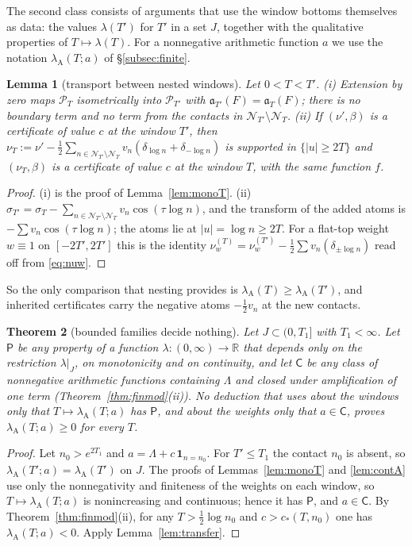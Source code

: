 \documentclass[11pt]{amsart}
\newtheorem{theorem}{Theorem}[section]
\newtheorem{lemma}[theorem]{Lemma}
\theoremstyle{definition}
\theoremstyle{remark}
\newcommand{\R}{\mathbb R}
\newcommand{\PT}{\mathcal P_T}
\newcommand{\lamA}{\lambda_{\mathrm A}(T)}
\newcommand{\sT}{\sigma_T}
\newcommand{\NT}{\mathcal N_T}
\begin{document}
The second class consists of arguments that use the window bottoms themselves as data: the values $\lambda(T')$ for
$T'$ in a set $J$, together with the qualitative properties of $T\mapsto\lambda(T)$. For a nonnegative arithmetic
function $a$ we use the notation $\lambda_{\mathrm A}(T;a)$ of \S\ref{subsec:finite}.

\begin{lemma}[transport between nested windows]\label{lem:transport}
Let $0<T<T'$. \emph{(i)} Extension by zero maps $\PT$ isometrically into $\mathcal P_{T'}$ with
$\mathfrak a_{T'}(F)=\mathfrak a_T(F)$; there is no boundary term and no term from the contacts in
$\mathcal N_{T'}\setminus\NT$. \emph{(ii)} If $(\nu',\beta)$ is a certificate of value $c$ at the window $T'$, then
$\nu_T:=\nu'-\frac12\sum_{n\in\mathcal N_{T'}\setminus\NT}v_n(\delta_{\log n}+\delta_{-\log n})$ is supported in
$\{|u|\ge2T\}$ and $(\nu_T,\beta)$ is a certificate of value $c$ at the window $T$, with the same function $f$.
\end{lemma}
\begin{proof}
(i) is the proof of Lemma~\ref{lem:monoT}. (ii) $\sigma_{T'}=\sT-\sum_{n\in\mathcal N_{T'}\setminus\NT}v_n\cos(\tau\log n)$,
and the transform of the added atoms is $-\sum v_n\cos(\tau\log n)$; the atoms lie at $|u|=\log n\ge2T$. For a
flat-top weight $w\equiv1$ on $[-2T',2T']$ this is the identity $\nu_w^{(T)}=\nu_w^{(T')}-\frac12\sum v_n(\delta_{\pm\log n})$
read off from \eqref{eq:nuw}.
\end{proof}

So the only comparison that nesting provides is $\lamA\ge\lambda_{\mathrm A}(T')$, and inherited certificates carry
the negative atoms $-\frac12v_n$ at the new contacts.

\begin{theorem}[bounded families decide nothing]\label{thm:famblind}
Let $J\subset(0,T_1]$ with $T_1<\infty$. Let $\mathsf P$ be any property of a function $\lambda:(0,\infty)\to\R$ that
depends only on the restriction $\lambda|_J$, on monotonicity and on continuity, and let $\mathsf C$ be any class of
nonnegative arithmetic functions containing $\Lambda$ and closed under amplification of one term
(Theorem~\ref{thm:finmod}(ii)). No deduction that uses about the windows only that $T\mapsto\lambda_{\mathrm A}(T;a)$
has $\mathsf P$, and about the weights only that $a\in\mathsf C$, proves $\lambda_{\mathrm A}(T;a)\ge0$ for every $T$.
\end{theorem}
\begin{proof}
Let $n_0>e^{2T_1}$ and $a=\Lambda+c\,\mathbf 1_{n=n_0}$. For $T'\le T_1$ the contact $n_0$ is absent, so
$\lambda_{\mathrm A}(T';a)=\lambda_{\mathrm A}(T')$ on $J$. The proofs of Lemmas~\ref{lem:monoT} and \ref{lem:contA}
use only the nonnegativity and finiteness of the weights on each window, so $T\mapsto\lambda_{\mathrm A}(T;a)$ is
nonincreasing and continuous; hence it has $\mathsf P$, and $a\in\mathsf C$. By Theorem~\ref{thm:finmod}(ii), for any
$T>\frac12\log n_0$ and $c>c_*(T,n_0)$ one has $\lambda_{\mathrm A}(T;a)<0$. Apply Lemma~\ref{lem:transfer}.
\end{proof}
\end{document}
